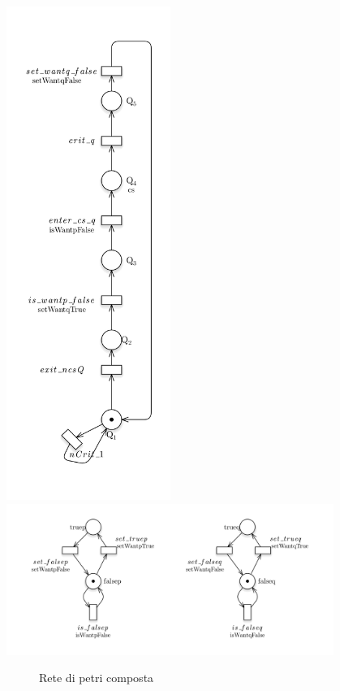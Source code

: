 \documentclass[a4paper]{article}
\begin{document}
\begin{center}
{\includegraphics[width=0.4\textwidth]{q3.8.png}
}
\includegraphics[width=0.8\textwidth]{variables_noTrue.png}
\end{center}
\newpage
\begin{figure}[!ht]
\centering
{}
\caption{Rete di petri composta} \label{FIG:3.8PN}
\end{figure}
\newpage
\end{document}
